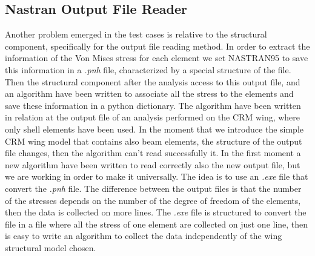 \subsection{Nastran Output File Reader}
Another problem emerged in the test cases is relative to the structural component, specifically for the output file reading method. In order to extract the information of the Von Mises stress for each element we set NASTRAN95 to save this information in a \textit{.pnh} file, characterized by a special structure of the file. Then the structural component after the analysis access to this output file, and an algorithm have been written to associate all the stress to the elements and save these information in a python dictionary. The algorithm have been written in relation at the output file of an analysis performed on the CRM wing, where only shell elements have been used. In the moment that we introduce the simple CRM wing model that contains also beam elements, the structure of the output file changes, then the algorithm can't read successfully it. In the first moment a new algorithm have been written to read correctly also the new output file, but we are working in order to make it universally. The idea is to use an \textit{.exe} file that convert the \textit{.pnh} file. The difference between the output files is that the number of the stresses depends on the number of the degree of freedom of the elements, then the data is collected on more lines. The \textit{.exe} file is structured to convert the file in a file where all the stress of one element are collected on just one line, then is easy to write an algorithm to collect the data independently of the wing structural model chosen. 
